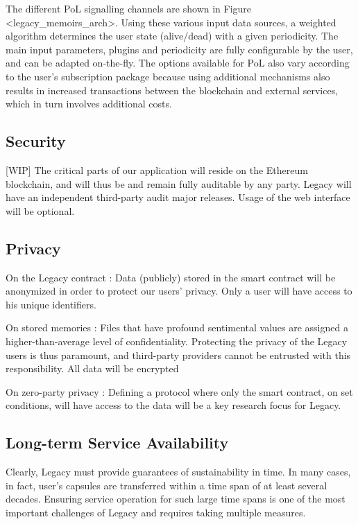 The different PoL signalling channels are shown in Figure <legacy_memoirs_arch>. Using these various input data sources, a weighted algorithm determines the user state (alive/dead) with a given periodicity. The main input parameters, plugins and periodicity are fully configurable by the user, and can be adapted on-the-fly. The options available for PoL also vary according to the user’s subscription package because using additional mechanisms also results in increased transactions between the blockchain and external services, which in turn involves additional costs. 

\subsection{Security} %
\label{sub:security}
[WIP]
The critical parts of our application will reside on the Ethereum blockchain, and will thus be and remain fully auditable by any party. Legacy will have an independent third-party audit major releases. Usage of the web interface will be optional.

\subsection{Privacy} %
\label{sub:privacy}
On the Legacy contract :
Data (publicly) stored in the smart contract will be anonymized in order to protect our users’ privacy. Only a user will have access to his unique identifiers.

On stored memories :
Files that have profound sentimental values are assigned a higher-than-average level of confidentiality. Protecting the privacy of the Legacy users is thus paramount, and third-party providers cannot be entrusted with this responsibility. All data will be encrypted

On zero-party privacy :
Defining a protocol where only the smart contract, on set conditions, will have access to the data will be a key research focus for Legacy.

\subsection{Long-term Service Availability} %
\label{sub:long_term_service_availability}
Clearly, Legacy must provide guarantees of sustainability in time. In many cases, in fact, user's capsules are transferred within a time span of at least several decades.  Ensuring service operation for such large time spans is one of the most important challenges of Legacy and requires taking multiple measures. 

